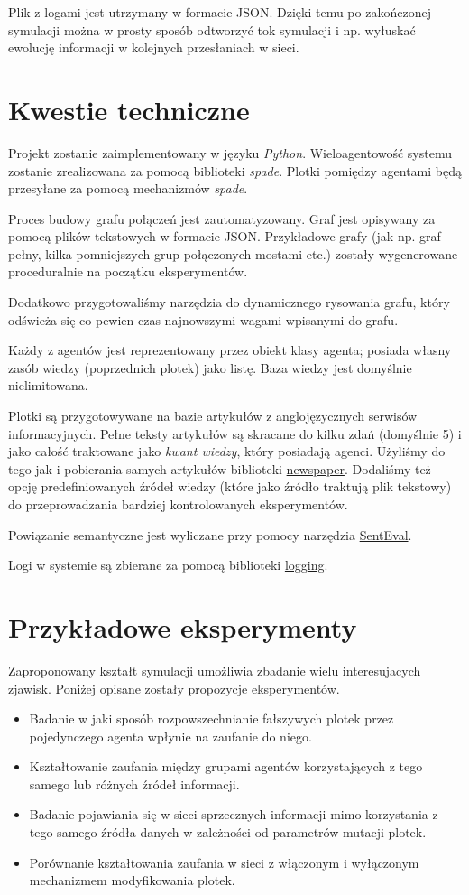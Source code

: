 \documentclass{article}
\begin{document}
	Plik z logami jest utrzymany w formacie JSON. Dzięki temu po zakończonej symulacji można w prosty sposób odtworzyć tok symulacji i np. wyłuskać ewolucję informacji w kolejnych przesłaniach w sieci.
	\section{Kwestie techniczne}
	Projekt zostanie zaimplementowany w języku \textit{Python}. Wieloagentowość systemu zostanie zrealizowana za pomocą biblioteki \textit{spade}. Plotki pomiędzy agentami będą przesyłane za pomocą mechanizmów \textit{spade}.
	
	Proces budowy grafu połączeń jest zautomatyzowany. Graf jest opisywany za pomocą plików tekstowych w formacie JSON. Przykładowe grafy (jak np. graf pełny, kilka pomniejszych grup połączonych mostami etc.) zostały wygenerowane proceduralnie na początku eksperymentów.

	Dodatkowo przygotowaliśmy narzędzia do dynamicznego rysowania grafu, który odświeża się co pewien czas najnowszymi wagami wpisanymi do grafu.
	
	Każdy z agentów jest reprezentowany przez obiekt klasy agenta; posiada własny zasób wiedzy (poprzednich plotek) jako listę. Baza wiedzy jest domyślnie nielimitowana.
	
	Plotki są przygotowywane na bazie artykułów z anglojęzycznych serwisów informacyjnych. Pełne teksty artykułów są skracane do kilku zdań (domyślnie 5) i jako całość traktowane jako \textit{kwant wiedzy}, który posiadają agenci. Użyliśmy do tego jak i pobierania samych artykułów  biblioteki \href{https://newspaper.readthedocs.io/}{newspaper}. Dodaliśmy też opcję predefiniowanych źródeł wiedzy (które jako źródło traktują plik tekstowy) do przeprowadzania bardziej kontrolowanych eksperymentów.
	
	Powiązanie semantyczne jest wyliczane przy pomocy narzędzia \href{http://nlpprogress.com/english/semantic_textual_similarity.html}{SentEval}.
	
	Logi w systemie są zbierane za pomocą biblioteki \href{https://docs.python.org/3/library/logging.html#module-logging}{logging}.
	
	\section{Przykładowe eksperymenty}
	Zaproponowany kształt symulacji umożliwia zbadanie wielu interesujacych zjawisk. Poniżej opisane zostały propozycje eksperymentów.
	\begin{itemize}
	\item Badanie w jaki sposób rozpowszechnianie fałszywych plotek przez pojedynczego agenta wpłynie na zaufanie do niego.
	\item Kształtowanie zaufania między grupami agentów korzystających z tego samego lub różnych źródeł informacji.
	\item Badanie pojawiania się w sieci sprzecznych informacji mimo korzystania z tego samego źródła danych w zależności od parametrów mutacji plotek.
	\item Porównanie kształtowania zaufania w sieci z włączonym i wyłączonym mechanizmem modyfikowania plotek.
	\end{itemize}
\end{document}
